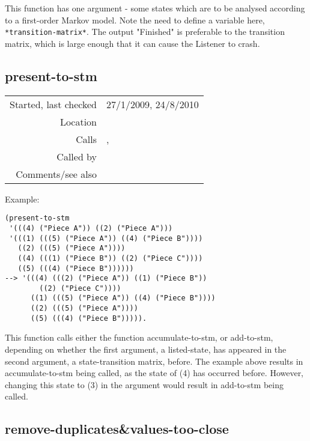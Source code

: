 \noindent This function has one argument - some states
which are to be analysed according to a first-order
Markov model. Note the need to define a variable here,
\texttt{*transition-matrix*}. The output "Finished" is
preferable to the transition matrix, which is large
enough that it can cause the Listener to crash.


\subsection*{present-to-stm}\label{fun:present-to-stm}

\vspace{0.3cm}
\begin{tabular}{r|p{8cm}}
Started, last checked & 27/1/2009, 24/8/2010 \\
Location & \nameref{sec:markov-analyse} \\
Calls & \nameref{fun:add-to-stm}, \nameref{fun:accumulate-to-stm} \\
Called by & \nameref{fun:update-stm} \\
Comments/see also & \nameref{fun:present-to-stm<-}
\end{tabular}

\vspace{0.5cm}
\noindent Example:
\begin{verbatim}
(present-to-stm
 '(((4) ("Piece A")) ((2) ("Piece A")))
 '(((1) (((5) ("Piece A")) ((4) ("Piece B"))))
   ((2) (((5) ("Piece A"))))
   ((4) (((1) ("Piece B")) ((2) ("Piece C"))))
   ((5) (((4) ("Piece B"))))))
--> '(((4) (((2) ("Piece A")) ((1) ("Piece B"))
	    ((2) ("Piece C"))))
      ((1) (((5) ("Piece A")) ((4) ("Piece B"))))
      ((2) (((5) ("Piece A"))))
      ((5) (((4) ("Piece B"))))).
\end{verbatim}

\noindent This function calls either the function
accumulate-to-stm, or add-to-stm, depending on whether
the first argument, a listed-state, has appeared in
the second argument, a state-transition matrix,
before. The example above results in accumulate-to-stm
being called, as the state of (4) has occurred before.
However, changing this state to (3) in the argument
would result in add-to-stm being called.


\subsection*{remove-duplicates\&values-too-close}\label{fun:remove-duplicates-n-values-too-close}

